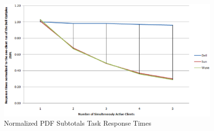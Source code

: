                 \begin{figure}[h!tb]
                    \centering
                    \includegraphics[scale=0.5]{graphics/graphic_pdf_test}
                    \caption{Normalized PDF Subtotals Task Response Times}
                    \label{fig:graphic_pdf_test}
                \end{figure}
